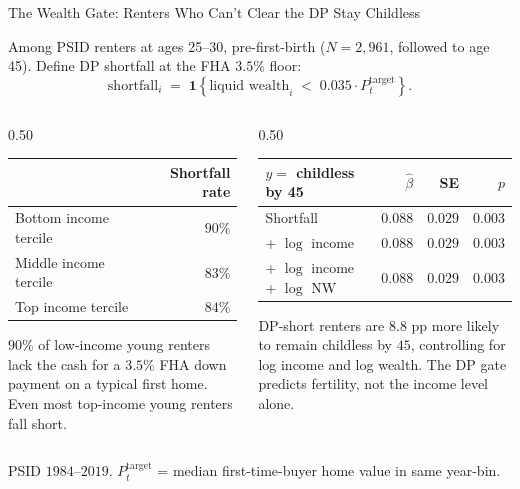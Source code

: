 \documentclass[11pt,aspectratio=169]{beamer}
\begin{document}
\begin{frame}{The Wealth Gate: Renters Who Can't Clear the DP Stay Childless}
\small

Among PSID renters at ages 25--30, pre-first-birth ($N = 2{,}961$, followed to age 45). Define DP shortfall at the FHA $3.5\%$ floor:
\[
\text{shortfall}_i \;=\; \mathbf{1}\!\left\{ \text{liquid wealth}_i \;<\; 0.035 \cdot P^{\text{target}}_t \right\}.
\]

\medskip
\begin{columns}[T,onlytextwidth]
\begin{column}{0.50\textwidth}
\centering
\begin{tabular}{lr}
\toprule
& Shortfall rate \\
\midrule
Bottom income tercile & $90\%$ \\
Middle income tercile & $83\%$ \\
Top income tercile    & $84\%$ \\
\bottomrule
\end{tabular}

\smallskip
\footnotesize
$90\%$ of low-income young renters lack the cash for a $3.5\%$ FHA down payment on a typical first home. Even most top-income young renters fall short.
\end{column}
\begin{column}{0.50\textwidth}
\centering
\begin{tabular}{lrrr}
\toprule
$y =$ childless by 45 & $\hat\beta$ & SE & $p$ \\
\midrule
Shortfall                          & $\mathbf{0.088}$ & $0.029$ & $0.003$ \\
\quad + $\log$ income              & $0.088$          & $0.029$ & $0.003$ \\
\quad + $\log$ income + $\log$ NW  & $0.088$          & $0.029$ & $0.003$ \\
\bottomrule
\end{tabular}

\smallskip
\footnotesize
DP-short renters are $8.8$ pp more likely to remain childless by $45$, controlling for log income and log wealth. The DP gate predicts fertility, not the income level alone.
\end{column}
\end{columns}

\medskip
\centering
\footnotesize PSID $1984$--$2019$. $P^{\text{target}}_t$ = median first-time-buyer home value in same year-bin.

\end{frame}
\end{document}
